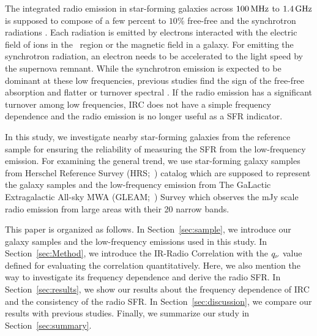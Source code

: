 The integrated radio emission in star-forming galaxies across $100\,\mathrm{MHz}$ to $1.4\,\mathrm{GHz}$ is supposed to compose of a few percent to $10\%$ free-free and the synchrotron radiations \citep{Condon1992a}.
Each radiation is emitted by electrons interacted with the electric field of ions in the \ih~region or the magnetic field in a galaxy.
For emitting the synchrotron radiation, an electron needs to be accelerated to the light speed by the supernova remnant.
While the synchrotron emission is expected to be dominant at these low frequencies, previous studies find the sign of the free-free absorption and flatter or turnover spectral \citep{Schober2017, Chyzy2018}.
If the radio emission has a significant turnover among low frequencies, IRC does not have a simple frequency dependence and the radio emission is no longer useful as a SFR indicator.

In this study, we investigate nearby star-forming galaxies from the reference sample for ensuring the reliability of measuring the SFR from the low-frequency emission.
For examining the general trend, we use star-forming galaxy samples from Herschel Reference Survey (HRS;~\citealt{Boselli2010}) catalog which are supposed to represent the galaxy samples and the low-frequency emission from The GaLactic Extragalactic All-sky MWA (GLEAM;~\citealt{Hurley-Walker2017a}) Survey which observes the mJy scale radio emission from large areas with their 20 narrow bands.

This paper is organized as follows.
In Section~\ref{sec:sample}, we introduce our galaxy samples and the low-frequency emissions used in this study.
In Section~\ref{sec:Method}, we introduce the IR-Radio Correlation with the $q_{\nu}$ value defined for evaluating the correlation quantitatively. Here, we also mention the way to investigate its frequency dependence and derive the radio SFR\@.
In Section~\ref{sec:results}, we show our results about the frequency dependence of IRC and the consistency of the radio SFR\@.
In Section~\ref{sec:discussion}, we compare our results with previous studies.
Finally, we summarize our study in Section~\ref{sec:summary}.









